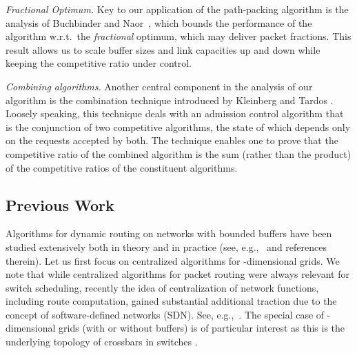 \documentclass[11pt]{article}
\newenvironment{proof sketch}[1]{\noindent {\emph{Proof sketch of #1:}}}{\hfill \qed}
\begin{document}
\emph{Fractional Optimum.}
Key to our application of the path-packing algorithm is
the analysis of Buchbinder and Naor~\cite{BN06,BNsurvey}, which
bounds the performance of the algorithm w.r.t.\ the \emph{fractional}
optimum, which may deliver packet fractions.
This result allows us to scale buffer sizes and link
capacities up and down while keeping the competitive ratio
under control.


\emph{Combining algorithms.} Another central component in the analysis of our
algorithm is the combination technique introduced by Kleinberg and Tardos \cite{KT}.
Loosely speaking, this technique deals with an admission control algorithm that is
the conjunction of two competitive algorithms, the state of which depends only on the
requests accepted by both. The technique enables one to prove that the competitive
ratio of the combined algorithm is the sum (rather than the product) of the
competitive ratios of the constituent algorithms.



\subsection{Previous Work}
Algorithms for dynamic routing on networks with bounded
buffers have been studied extensively both in theory and in practice
(see, e.g.,~\cite{AKRR} and references therein).
Let us first focus on centralized algorithms for -dimensional grids.
We note that while centralized algorithms for packet routing were
always relevant for switch scheduling, recently the idea of centralization of
network functions, including route computation, gained substantial
additional traction due to
the concept of software-defined networks (SDN). See, e.g.,~\cite{nox}.
 The special case of -dimensional grids (with or without
buffers) is of particular interest as this is the underlying
topology of crossbars in switches \cite{T}.
\end{document}
